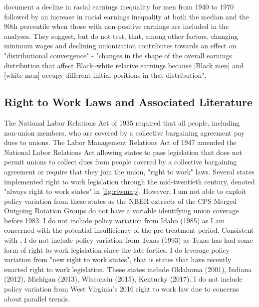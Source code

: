 \documentclass[11pt]{article}
\begin{document}
\citet{bayercharles2018} document a decline in racial earnings inequality for men from 1940 to 1970 followed by an increase in racial earnings inequality at both the median and the 90th percentile when those with non-positive earnings are included in the analyses. They suggest, but do not test, that, among other factors, changing minimum wages and declining unionization contributes towards an effect on "distributional convergence" - "changes in the shape of the overall earnings distribution that affect Black–white relative earnings because [Black men] and [white men] occupy different initial positions in that distribution".


\subsection{Right to Work Laws and Associated Literature}
The National Labor Relations Act of 1935 required that all people, including non-union members, who are covered by a collective bargaining agreement pay dues to unions. The Labor Management Relations Act of 1947 amended the National Labor Relations Act allowing states to pass legislation that does not permit unions to collect dues from people covered by a collective bargaining agreement or require that they join the union, "right to work" laws. Several states implemented right to work legislation through the mid-twentieth century, denoted "always right to work states" in \autoref{fig:rtwmap}. However, I am not able to exploit policy variation from these states as the NBER extracts of the CPS Merged Outgoing Rotation Groups do not have a variable identifying union coverage before 1983. I do not include policy variation from Idaho (1985) as I am concerned with the potential insufficiency of the pre-treatment period. Consistent with \citet{fll2018}, I do not include policy variation from Texas (1993) as Texas has had some form of right to work legislation since the late forties. I do leverage policy variation from "new right to work states", that is states that have recently enacted right to work legislation. These states include Oklahoma (2001), Indiana (2012), Michigan (2013), Wisconsin (2015), Kentucky (2017). I do not include policy variation from West Virginia's 2016 right to work law due to concerns about parallel trends. 
\end{document}
